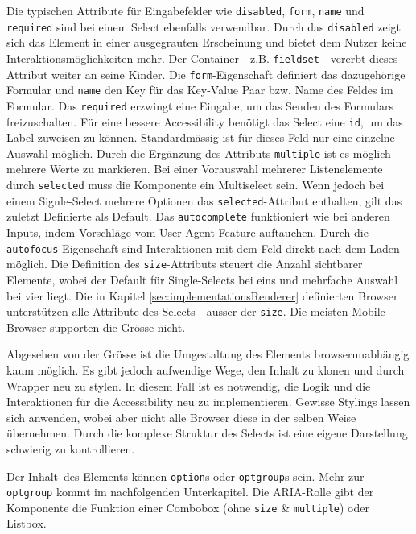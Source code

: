 Die typischen Attribute für Eingabefelder wie \texttt{disabled}, \texttt{form}, \texttt{name} und \texttt{required} sind bei einem Select ebenfalls verwendbar.
Durch das \texttt{disabled} zeigt sich das Element in einer ausgegrauten Erscheinung und bietet dem Nutzer keine Interaktionsmöglichkeiten mehr.
Der Container - z.B. \texttt{fieldset} - vererbt dieses Attribut weiter an seine Kinder. 
Die \texttt{form}-Eigenschaft definiert das dazugehörige Formular und \texttt{name} den Key für das Key-Value Paar bzw. Name des Feldes im Formular. 
Das \texttt{required} erzwingt eine Eingabe, um das Senden des Formulars freizuschalten.
Für eine bessere Accessibility benötigt das Select eine \texttt{id}, um das Label zuweisen zu können. 
Standardmässig ist für dieses Feld nur eine einzelne Auswahl möglich.
Durch die Ergänzung des Attributs \texttt{multiple} ist es möglich mehrere Werte zu markieren.
Bei einer Vorauswahl mehrerer Listenelemente durch \texttt{selected} muss die Komponente ein Multiselect sein.
Wenn jedoch bei einem Signle-Select mehrere Optionen das \texttt{selected}-Attribut enthalten, gilt das zuletzt Definierte als Default.
Das \texttt{autocomplete} funktioniert wie bei anderen Inputs, indem Vorschläge vom User-Agent-Feature auftauchen.
Durch die \texttt{autofocus}-Eigenschaft sind Interaktionen mit dem Feld direkt nach dem Laden möglich.
Die Definition des \texttt{size}-Attributs steuert die Anzahl sichtbarer Elemente, wobei der Default für Single-Selects bei eins und mehrfache Auswahl bei vier liegt.
Die in Kapitel \ref{sec:implementationsRenderer} definierten Browser unterstützen alle Attribute des Selects - ausser der \texttt{size}.
Die meisten Mobile-Browser supporten die Grösse nicht.

Abgesehen von der Grösse ist die Umgestaltung des Elements browserunabhängig kaum möglich.
Es gibt jedoch aufwendige Wege, den Inhalt zu klonen und durch Wrapper neu zu stylen.
In diesem Fall ist es notwendig, die Logik und die Interaktionen für die Accessibility neu zu implementieren.
Gewisse Stylings lassen sich anwenden, wobei aber nicht alle Browser diese in der selben Weise übernehmen.
Durch die komplexe Struktur des Selects ist eine eigene Darstellung schwierig zu kontrollieren.

Der Inhalt\footnotemark \ des Elements können \texttt{option}s oder \texttt{optgroup}s sein.
Mehr zur \texttt{optgroup} kommt im nachfolgenden Unterkapitel.
Die ARIA-Rolle gibt der Komponente die Funktion einer Combobox (ohne \texttt{size} \& \texttt{multiple}) oder Listbox.

